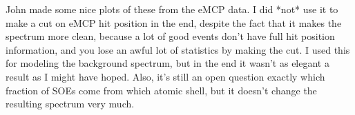 John made some nice plots of these from the eMCP data.  I did *not* use it to make a cut on eMCP hit position in the end, despite the fact that it makes the spectrum more clean, because a lot of good events don't have full hit position information, and you lose an awful lot of statistics by making the cut.  I used this for modeling the background spectrum, but in the end it wasn't as elegant a result as I might have hoped.  Also, it's still an open question exactly which fraction of SOEs come from which atomic shell, but it doesn't change the resulting spectrum very much.

